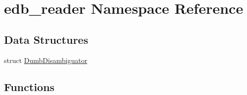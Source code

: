 \hypertarget{namespaceedb__reader}{}\section{edb\+\_\+reader Namespace Reference}
\label{namespaceedb__reader}
\subsection*{Data Structures}
\begin{DoxyCompactItemize}
\item 
struct \mbox{\hyperlink{structedb__reader_1_1DumbDisambiguator}{Dumb\+Disambiguator}}
\end{DoxyCompactItemize}
\subsection*{Functions}
